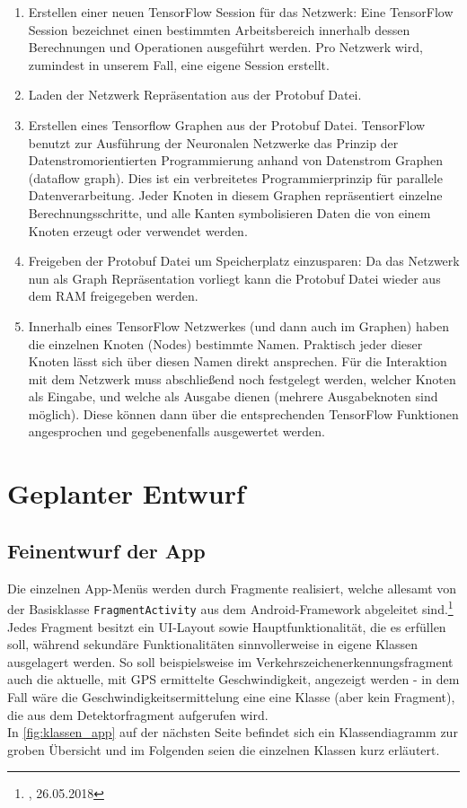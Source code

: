 \documentclass[12pt,a4paper,ngerman,enabledeprecatedfontcommands]{scrreprt}
\begin{document}
\begin{enumerate}
    \item Erstellen einer neuen TensorFlow Session für das Netzwerk: Eine TensorFlow Session bezeichnet einen bestimmten Arbeitsbereich innerhalb dessen Berechnungen und Operationen ausgeführt werden. Pro Netzwerk wird, zumindest in unserem Fall, eine eigene Session erstellt.
    \item Laden der Netzwerk Repräsentation aus der Protobuf Datei.
    \item Erstellen eines Tensorflow Graphen aus der Protobuf Datei. TensorFlow benutzt zur Ausführung der Neuronalen Netzwerke das Prinzip der Datenstromorientierten Programmierung anhand von Datenstrom Graphen (dataflow graph). Dies ist ein verbreitetes Programmierprinzip für parallele Datenverarbeitung. Jeder Knoten in diesem Graphen repräsentiert einzelne Berechnungsschritte, und alle Kanten symbolisieren Daten die von einem Knoten erzeugt oder verwendet werden.
    \item Freigeben der Protobuf Datei um Speicherplatz einzusparen: Da das Netzwerk nun als Graph Repräsentation vorliegt kann die Protobuf Datei wieder aus dem RAM freigegeben werden.
    \item  Innerhalb eines TensorFlow Netzwerkes (und dann auch im Graphen) haben die einzelnen Knoten (Nodes) bestimmte Namen. Praktisch jeder dieser Knoten lässt sich über diesen Namen direkt ansprechen. Für die Interaktion mit dem Netzwerk muss abschließend noch festgelegt werden, welcher Knoten als Eingabe, und welche als Ausgabe dienen (mehrere Ausgabeknoten sind möglich). Diese können dann über die entsprechenden TensorFlow Funktionen angesprochen und gegebenenfalls ausgewertet werden.
\end{enumerate}



\chapter{Geplanter Entwurf}
\section{Feinentwurf der \gls{App}}
Die einzelnen \gls{App}-Menüs werden durch Fragmente realisiert, welche allesamt von der Basisklasse \texttt{FragmentActivity} aus dem Android-Framework abgeleitet sind.\footnote{, 26.05.2018} Jedes Fragment besitzt ein \gls{UI}-Layout sowie Hauptfunktionalität, die es erfüllen soll, während sekundäre Funktionalitäten sinnvollerweise in eigene Klassen ausgelagert werden. So soll beispielsweise im Verkehrszeichenerkennungsfragment auch die aktuelle, mit GPS ermittelte Geschwindigkeit, angezeigt werden - in dem Fall wäre die Geschwindigkeitsermittelung eine eine Klasse (aber kein Fragment), die aus dem Detektorfragment aufgerufen wird.\\
In \cref{fig:klassen_app} auf der nächsten Seite befindet sich ein Klassendiagramm zur groben Übersicht und im Folgenden seien die einzelnen Klassen kurz erläutert.\\
\end{document}
